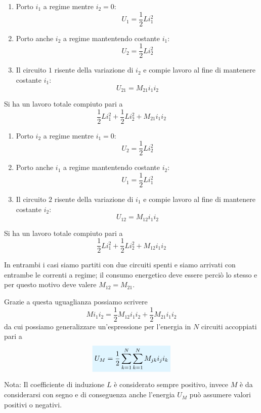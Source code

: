 \documentclass[x11names]{report}
\newcommand{\nota}[2]{
	\begin{attenzione}{Nota:}
		#2
	\end{attenzione}
}
\newcommand{\viola}[1]{%
	\colorbox{myblue}{$\displaystyle #1$}
}
\begin{document}
\vspace{0.5cm}
\hspace{-0.7cm}
\begin{minipage}{0.5\textwidth}
	\begin{enumerate}
		\item Porto \(i_1\) a regime mentre \(i_2 = 0\): 
		\[ U_1=\frac{1}{2}Li_1^2\]
		\item Porto anche \(i_2\) a regime mantentendo costante \(i_1\): \[U_2=\frac{1}{2}Li_2^2\]
		\item Il circuito \(1\) risente della variazione di \(i_2\) e compie lavoro al fine di mantenere costante \(i_1\):
		\[U_{21} = M_{21} i_1 i_2\]
	\end{enumerate}
	Si ha un lavoro totale compiuto pari a 
	\[
	\frac{1}{2}Li_1^2 + \frac{1}{2}Li_2^2 + M_{21} i_1 i_2
	\]
\end{minipage}
\begin{minipage}{0.5\textwidth}
	\begin{enumerate}
		\item Porto \(i_2\) a regime mentre \(i_1 = 0\): 
		\[ U_2=\frac{1}{2}Li_2^2\]
		\item Porto anche \(i_1\) a regime mantentendo costante \(i_2\): \[U_1=\frac{1}{2}Li_1^2\]
		\item Il circuito \(2\) risente della variazione di \(i_1\) e compie lavoro al fine di mantenere costante \(i_2\):
		\[U_{12} = M_{12} i_1 i_2\]
	\end{enumerate}
	Si ha un lavoro totale compiuto pari a 
	\[
	\frac{1}{2}Li_1^2 + \frac{1}{2}Li_2^2 + M_{12} i_1 i_2
	\]
\end{minipage}
\vspace{0.5cm}

\noindent
In entrambi i casi siamo partiti con due circuiti spenti e siamo arrivati con entrambe le correnti a regime; il consumo energetico deve essere perciò lo stesso e per questo motivo deve valere \(M_{12} = M_{21}\).

Grazie a questa uguaglianza possiamo scrivere
\[
Mi_1i_2 = \frac{1}{2}M_{12}i_1i_2 + \frac{1}{2}M_{21}i_1i_2 
\]
da cui possiamo generalizzare un'espressione per l'energia in \(N\) circuiti accoppiati pari a 
\begin{equation}
	\viola{U_M = \frac{1}{2}\sum_{k=1}^N\sum_{k=1}^N M_{jk}i_ji_k}
\end{equation}
\nota{}{Il coefficiente di induzione \(L\) è considerato sempre positivo, invece \(M\) è da considerarsi con segno e di conseguenza anche l'energia \(U_M\) può assumere valori positivi o negativi.}
\end{document}

